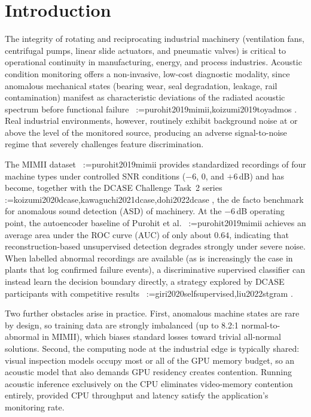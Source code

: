 \documentclass[review,nopreprintline]{elsarticle}
\makeatletter
\newif\ifmc@notfirst
\let\@oldcite\cite
\def\mc@splitcite#1{%
    \begingroup
    \mc@notfirstfalse
    \@for\@citekey:=#1\do{%
      \ifmc@notfirst, \fi
      \mc@notfirsttrue
      \@oldcite{\@citekey}%
    }%
    \endgroup
  }%
\def\cite#1{\protect\mc@splitcite{#1}}%
\makeatother
\begin{document}
\section{Introduction}
\label{sec:intro}

The integrity of rotating and reciprocating industrial machinery (ventilation fans, centrifugal pumps, linear slide actuators, and pneumatic valves) is critical to operational continuity in manufacturing, energy, and process industries. Acoustic condition monitoring offers a non-invasive, low-cost diagnostic modality, since anomalous mechanical states (bearing wear, seal degradation, leakage, rail contamination) manifest as characteristic deviations of the radiated acoustic spectrum before functional failure~\cite{purohit2019mimii,koizumi2019toyadmos}. Real industrial environments, however, routinely exhibit background noise at or above the level of the monitored source, producing an adverse signal-to-noise regime that severely challenges feature discrimination.

The MIMII dataset~\cite{purohit2019mimii} provides standardized recordings of four machine types under controlled SNR conditions ($-6$, $0$, and $+6$\,dB) and has become, together with the DCASE Challenge Task~2 series~\cite{koizumi2020dcase,kawaguchi2021dcase,dohi2022dcase}, the de facto benchmark for anomalous sound detection (ASD) of machinery. At the $-6$\,dB operating point, the autoencoder baseline of Purohit et al.~\cite{purohit2019mimii} achieves an average area under the ROC curve (AUC) of only about $0.64$, indicating that reconstruction-based unsupervised detection degrades strongly under severe noise. When labelled abnormal recordings are available (as is increasingly the case in plants that log confirmed failure events), a discriminative supervised classifier can instead learn the decision boundary directly, a strategy explored by DCASE participants with competitive results~\cite{giri2020selfsupervised,liu2022stgram}.

Two further obstacles arise in practice. First, anomalous machine states are rare by design, so training data are strongly imbalanced (up to 8.2:1 normal-to-abnormal in MIMII), which biases standard losses toward trivial all-normal solutions. Second, the computing node at the industrial edge is typically shared: visual inspection models occupy most or all of the GPU memory budget, so an acoustic model that also demands GPU residency creates contention. Running acoustic inference exclusively on the CPU eliminates video-memory contention entirely, provided CPU throughput and latency satisfy the application's monitoring rate.
\end{document}
